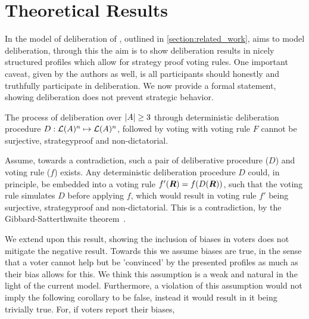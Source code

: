\newpage
\chapter{Theoretical Results}
\label{theory}


In the model of deliberation of \citet{radDeliberationSinglePeakednessCoherent2021a}, outlined in \cref{section:related_work}, aims to model deliberation, through this the aim is to show deliberation results in nicely structured profiles which allow for strategy proof voting rules. One important caveat, given by the authors as well, is all participants should honestly and truthfully participate in deliberation. We now provide a formal statement, showing deliberation does not prevent strategic behavior.

\begin{proposition}
	The process of deliberation over $|A| \geq 3$ through deterministic deliberation procedure \({D}: \mathcal{L}(A)^n \mapsto \mathcal{L}(A)^n\), followed by voting with voting rule $F$ cannot be surjective, strategyproof and non-dictatorial.

	\label{proposition:deterministic-delib}
\end{proposition}

\begin{proofc}
	Assume, towards a contradiction, such a pair of deliberative procedure ($D$) and voting rule (\(f\)) exists. Any deterministic deliberation procedure $D$ could, in principle, be embedded into a voting rule $f'(\boldsymbol{R}) = f(D(\boldsymbol{R}))$, such that the voting rule simulates $D$ before applying $f$, which would result in  voting rule $f'$ being surjective, strategyproof and non-dictatorial. This is a contradiction, by the Gibbard-Satterthwaite theorem~\citep{gibbardManipulationVotingSchemes1973,satterthwaiteStrategyproofnessArrowsConditions1975}.
\end{proofc}


We extend upon this result, showing the inclusion of biases in voters does not mitigate the negative result. Towards this we assume biases are true, in the sense that a voter cannot help but be 'convinced' by the presented profiles as much as their bias allows for this. We think this assumption is a weak and natural in the light of the current model. Furthermore, a violation of this assumption would not imply the following corollary to be false, instead it would result in it being trivially true. For, if voters report their biases,

